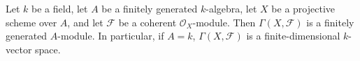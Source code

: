 Let $k$ be a field, let $A$ be a finitely generated $k$-algebra, let $X$ be a projective scheme over $A$, and let $\mathcal{F}$ be a coherent $\mathcal{O}_X$-module. Then $\Gamma(X, \mathcal{F})$ is a finitely generated $A$-module. In particular, if $A = k$, $\Gamma(X, \mathcal{F})$ is a finite-dimensional $k$-vector space.
